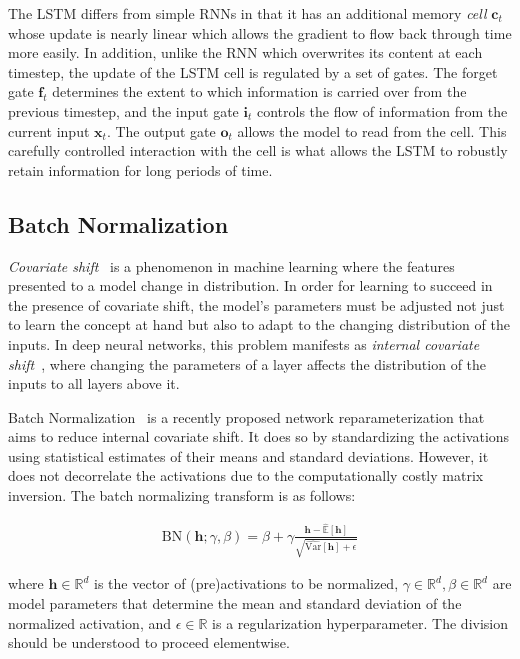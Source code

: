 \documentclass{article} %
\newcommand{\vect}[1]{\mathbf{#1}}
\newcommand{\reals}{\mathbb{R}}
\begin{document}
The LSTM differs from simple RNNs in that it has an additional memory \emph{cell} 
$\vect{c}_t$ whose update is nearly linear which allows the gradient to flow back 
through time more easily. In addition, unlike the RNN which overwrites its content 
at each timestep, the update of the LSTM cell is regulated by a set of gates.
The forget gate $\vect{f}_t$ determines the extent to which information is carried over from the previous timestep,
and the input gate $\vect{i}_t$ controls the flow of information from the current input $\vect{x}_t$.
The output gate $\vect{o}_t$ allows the model to read from the cell. This carefully 
controlled interaction with the cell is what allows the LSTM to robustly retain 
information for long periods of time.

\subsection{Batch Normalization}

\emph{Covariate shift}~\cite{shimodaira2000improving} is a phenomenon in machine learning where
the features presented to a model change in distribution.
In order for learning to succeed in the presence of covariate shift,
the model's parameters must be adjusted not just to learn the concept at hand
but also to adapt to the changing distribution of the inputs.
In deep neural networks, this problem manifests as \emph{internal covariate shift}~\cite{batchnorm},
where changing the parameters of a layer affects the distribution of the inputs to all layers above it.

Batch Normalization~\cite{batchnorm} is a recently proposed network reparameterization that aims to reduce internal covariate shift.
It does so by standardizing the activations using statistical estimates of their means and standard deviations.
However, it does not decorrelate the activations due to the computationally costly matrix inversion.
The batch normalizing transform is as follows:

\begin{align}
\mathrm{BN}(\vect{h}; \gamma, \beta) =
  \beta + \gamma
  \frac{\vect{h} -   \widehat{\mathbb{E  }}[\vect{h}]}
       {       \sqrt{\widehat{\mathrm{Var}}[\vect{h}] + \epsilon}}
\end{align}

where $\vect{h} \in \reals^d$ is the vector of (pre)activations to be normalized, 
$\gamma \in \reals^d, \beta \in \reals^d$ are model parameters that determine the 
mean and standard deviation of the normalized activation, and $\epsilon \in \reals$ 
is a regularization hyperparameter. The division should be understood to proceed elementwise.
\end{document}
